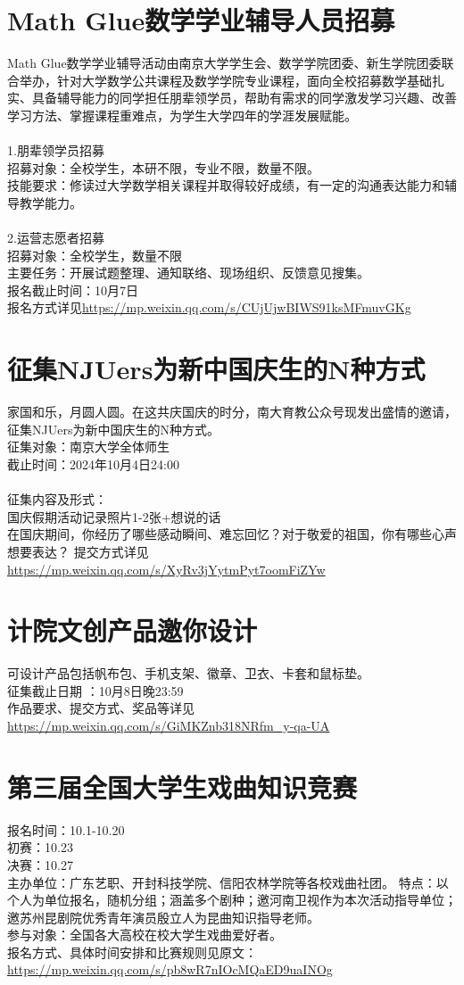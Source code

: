 \documentclass[letterpaper, 12pt]{article}
\begin{document}
\begin{multicols}{2}
\section{Math Glue数学学业辅导人员招募}
Math Glue数学学业辅导活动由南京大学学生会、数学学院团委、新生学院团委联合举办，针对大学数学公共课程及数学学院专业课程，面向全校招募数学基础扎实、具备辅导能力的同学担任朋辈领学员，帮助有需求的同学激发学习兴趣、改善学习方法、掌握课程重难点，为学生大学四年的学涯发展赋能。\\\\
1.朋辈领学员招募\\
招募对象：全校学生，本研不限，专业不限，数量不限。\\
技能要求：修读过大学数学相关课程并取得较好成绩，有一定的沟通表达能力和辅导教学能力。\\\\
2.运营志愿者招募\\
招募对象：全校学生，数量不限\\
主要任务：开展试题整理、通知联络、现场组织、反馈意见搜集。\\
报名截止时间：10月7日\\
报名方式详见\url{https://mp.weixin.qq.com/s/CUjUjwBIWS91ksMFmuvGKg}
\section{征集NJUers为新中国庆生的N种方式}
家国和乐，月圆人圆。在这共庆国庆的时分，南大育教公众号现发出盛情的邀请，征集NJUers为新中国庆生的N种方式。\\
征集对象：南京大学全体师生\\
截止时间：2024年10月4日24:00\\\\
征集内容及形式：\\
国庆假期活动记录照片1-2张+想说的话\\
在国庆期间，你经历了哪些感动瞬间、难忘回忆？对于敬爱的祖国，你有哪些心声想要表达？
提交方式详见\url{https://mp.weixin.qq.com/s/XyRv3jYytmPyt7oomFiZYw}
\section{计院文创产品邀你设计}
可设计产品包括帆布包、手机支架、徽章、卫衣、卡套和鼠标垫。\\
征集截止日期 ：10月8日晚23:59\\
作品要求、提交方式、奖品等详见\url{https://mp.weixin.qq.com/s/GiMKZnb318NRfm_y-qa-UA}

\section{第三届全国大学生戏曲知识竞赛}
报名时间：10.1-10.20\\
初赛：10.23\\
决赛：10.27\\
主办单位：广东艺职、开封科技学院、信阳农林学院等各校戏曲社团。
特点：以个人为单位报名，随机分组；涵盖多个剧种；邀河南卫视作为本次活动指导单位；邀苏州昆剧院优秀青年演员殷立人为昆曲知识指导老师。\\
参与对象：全国各大高校在校大学生戏曲爱好者。\\
报名方式、具体时间安排和比赛规则见原文：\url{https://mp.weixin.qq.com/s/pb8wR7nIOcMQaED9uaINOg}

\end{multicols}
\end{document}
